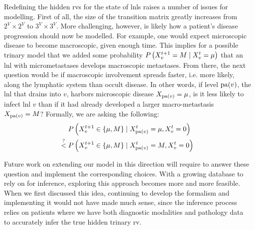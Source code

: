 \documentclass[\relativeRoot/main.tex]{subfiles}
\begin{document}
Redefining the hidden \glspl{rv} for the state of \glspl{lnl} raises a number of issues for modelling. First of all, the size of the transition matrix greatly increases from $2^V \times 2^V$ to $3^V \times 3^V$. More challenging, however, is likely how a patient's disease progression should now be modelled. For example, one would expect microscopic disease to become macroscopic, given enough time. This implies for a possible trinary model that we added some probability $P \left( X^{t+1}_v=M \mid X_v^t=\mu \right)$ that an \gls{lnl} with micrometastases develops macroscopic metastases. From there, the next question would be if macroscopic involvement spreads faster, i.e. more likely, along the lymphatic system than occult disease. In other words, if level $\operatorname{pa}(v)$, the \gls{lnl} that drains into $v$, harbors microscopic disease $X_{\operatorname{pa}(v)} = \mu$, is it less likely to infect \gls{lnl} $v$ than if it had already developed a larger macro-metastasis $X_{\operatorname{pa}(v)} = M$? Formally, we are asking the following:
%
\begin{equation}
    \begin{aligned}
        &P \left( X^{t+1}_v \in \{ \mu, M \} \mid X^t_{\operatorname{pa}(v)}=\mu, X_v^t=0 \right) \\
        \stackrel{?}{<} \; &P \left( X^{t+1}_v \in \{ \mu, M \} \mid X^t_{\operatorname{pa}(v)}=M, X_v^t=0 \right)
    \end{aligned}
\end{equation}

Future work on extending our model in this direction will require to answer these question and implement the corresponding choices. With a growing database to rely on for inference, exploring this approach becomes more and more feasible. When we first discussed this idea, continuing to develop the formalism and implementing it would not have made much sense, since the inference process relies on patients where we have both diagnostic modalities and pathology data to accurately infer the true hidden trinary \gls{rv}.
\end{document}
